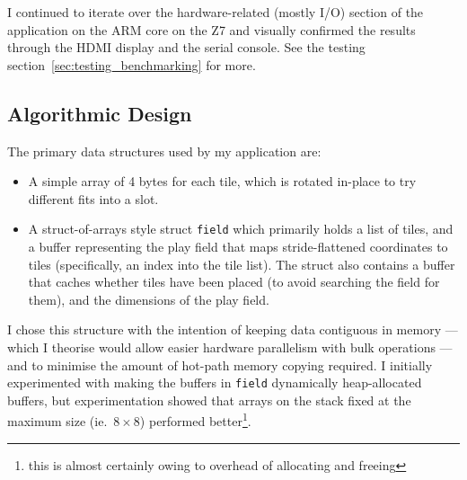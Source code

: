 \documentclass[11pt]{article}
\begin{document}
I continued to iterate over the hardware-related (mostly I/O) section of the application on the ARM core on the Z7 and visually confirmed the results through the HDMI display and the serial console. See the testing section~\ref{sec:testing_benchmarking} for more.

\subsection{Algorithmic Design}


The primary data structures used by my application are:

\begin{itemize}
  \item A simple array of 4 bytes for each tile, which is rotated in-place to try different fits into a slot.
  \item A struct-of-arrays style struct \verb|field| which primarily holds a list of tiles, and a buffer representing the play field that maps stride-flattened coordinates to tiles (specifically, an index into the tile list).
    The struct also contains a buffer that caches whether tiles have been placed (to avoid searching the field for them), and the dimensions of the play field.
\end{itemize}



I chose this structure with the intention of keeping data contiguous in memory --- which I theorise would allow easier hardware parallelism with bulk operations --- and to minimise the amount of hot-path memory copying required.
I initially experimented with making the buffers in \verb|field| dynamically heap-allocated buffers, but experimentation showed that arrays on the stack fixed at the maximum size (ie.\ $8 \times 8$) performed better\footnote{this is almost certainly owing to overhead of allocating and freeing}.

\end{document}
